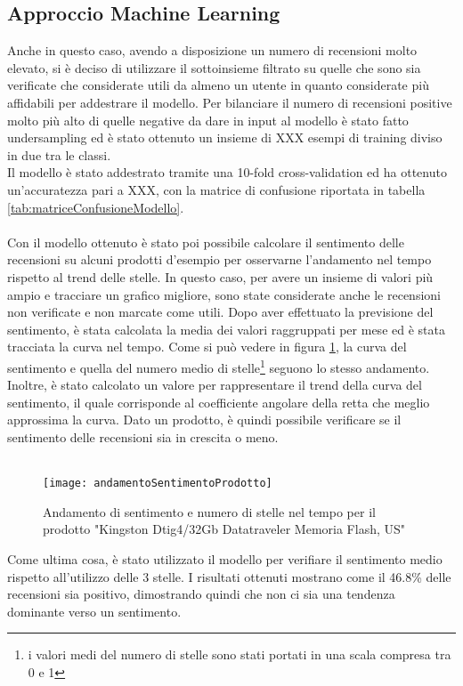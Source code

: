 \subsection{Approccio Machine Learning}\label{ApproccioMachineLearning}

Anche in questo caso, avendo a disposizione un numero di recensioni molto elevato, si è deciso di utilizzare il sottoinsieme filtrato su quelle che sono sia verificate che considerate utili da almeno un utente in quanto considerate più affidabili per addestrare il modello. Per bilanciare il numero di recensioni positive molto più alto di quelle negative da dare in input al modello è stato fatto undersampling ed è stato ottenuto un insieme di XXX esempi di training diviso in due tra le classi. \\
Il modello è stato addestrato tramite una 10-fold cross-validation ed ha ottenuto un'accuratezza pari a XXX, con la matrice di confusione riportata in tabella \ref{tab:matriceConfusioneModello}. \\\\

Con il modello ottenuto è stato poi possibile calcolare il sentimento delle recensioni su alcuni prodotti d'esempio per osservarne l'andamento nel tempo rispetto al trend delle stelle. In questo caso, per avere un insieme di valori più ampio e tracciare un grafico migliore, sono state considerate anche le recensioni non verificate e non marcate come utili. Dopo aver effettuato la previsione del sentimento, è stata calcolata la media dei valori raggruppati per mese ed è stata tracciata la curva nel tempo. Come si può vedere in figura \ref{fig:andamentoSentimentoProdotto}, la curva del sentimento e quella del numero medio di stelle\footnote{i valori medi del numero di stelle sono stati portati in una scala compresa tra 0 e 1} seguono lo stesso andamento. Inoltre, è stato calcolato un valore per rappresentare il trend della curva del sentimento, il quale corrisponde al coefficiente angolare della retta che meglio approssima la curva. Dato un prodotto, è quindi possibile verificare se il sentimento delle recensioni sia in crescita o meno. \\\\

\begin{figure}[]
    \texttt{[image: andamentoSentimentoProdotto]}\centering
    \caption{Andamento di sentimento e numero di stelle nel tempo per il prodotto "Kingston Dtig4/32Gb Datatraveler Memoria Flash, US"}\label{fig:andamentoSentimentoProdotto}
\end{figure}

Come ultima cosa, è stato utilizzato il modello per verifiare il sentimento medio rispetto all'utilizzo delle 3 stelle. I risultati ottenuti mostrano come il 46.8\% delle recensioni sia positivo, dimostrando quindi che non ci sia una tendenza dominante verso un sentimento.


